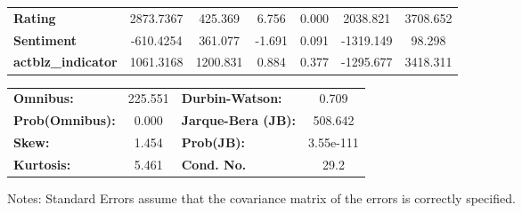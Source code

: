 \documentclass{report}
\begin{document}
\begin{center}
\begin{tabular}{lcccccc}
\textbf{Rating}            &    2873.7367  &      425.369     &     6.756  &         0.000        &     2038.821    &     3708.652     \\
\textbf{Sentiment}         &    -610.4254  &      361.077     &    -1.691  &         0.091        &    -1319.149    &       98.298     \\
\textbf{actblz\_indicator} &    1061.3168  &     1200.831     &     0.884  &         0.377        &    -1295.677    &     3418.311     \\
\bottomrule
\end{tabular}
\begin{tabular}{lclc}
\textbf{Omnibus:}       & 225.551 & \textbf{  Durbin-Watson:     } &     0.709  \\
\textbf{Prob(Omnibus):} &   0.000 & \textbf{  Jarque-Bera (JB):  } &   508.642  \\
\textbf{Skew:}          &   1.454 & \textbf{  Prob(JB):          } & 3.55e-111  \\
\textbf{Kurtosis:}      &   5.461 & \textbf{  Cond. No.          } &      29.2  \\
\bottomrule
\end{tabular}
\end{center}

Notes: \newline
 [1] Standard Errors assume that the covariance matrix of the errors is correctly specified.
\end{document}
